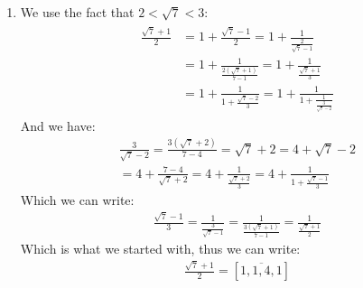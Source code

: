 \begin{enumerate}[label=]
    \item 
        We use the fact that $2 < \sqrt{7} < 3$:
        \begin{gather*}
            \begin{split}
                \frac{\sqrt{7} + 1}{2} & = 1 + \frac{\sqrt{7} - 1}{2} = 1 + \frac{1}{\frac{2}{\sqrt{7} - 1}} \\
                & = 1 + \frac{1}{\frac{2(\sqrt{7} + 1)}{7 - 1}} = 1 + \frac{1}{\frac{\sqrt{7} + 1}{3}} \\
                & = 1 + \frac{1}{1 + \frac{\sqrt{7} - 2}{3}} = 1 + \frac{1}{1 + \frac{1}{\frac{3}{\sqrt{7} - 2}}}
            \end{split}
        \end{gather*}
        And we have:
        \begin{gather*}
            \frac{3}{\sqrt{7} - 2} = \frac{3(\sqrt{7} + 2)}{7 - 4} = \sqrt{7} + 2 = 4 + \sqrt{7} - 2 \\
            = 4 + \frac{7 - 4}{\sqrt{7} + 2} = 4 + \frac{1}{\frac{\sqrt{7} + 2}{3}} = 4 + \frac{1}{1 + \frac{\sqrt{7} - 1}{3}}
        \end{gather*}
        Which we can write:
        \begin{gather*}
            \frac{\sqrt{7}- 1}{3} = \frac{1 }{\frac{3}{\sqrt{7} - 1}} = \frac{1}{\frac{3(\sqrt{7} + 1)}{7 - 1}} = \frac{1}{\frac{\sqrt{7} + 1}{2}}
        \end{gather*}
        Which is what we started with, thus we can write:
        \begin{gather*}
            \frac{\sqrt{7} + 1}{2} = [\overline{1, 1, 4, 1}]
        \end{gather*}
\end{enumerate}